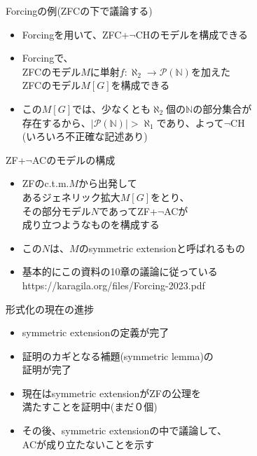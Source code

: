 \documentclass[17pt,aspectratio=169]{beamer}
\begin{document}
\begin{frame} {Forcingの例{\small (ZFCの下で議論する)}}
    \begin{itemize}
        \item Forcingを用いて、ZFC+$\neg$CHのモデルを構成できる
        \item Forcingで、\\
              ZFCのモデル$M$に単射$f : \aleph_2 \rightarrow \mathcal{P}(\mathbb{N})$を加えた\\
              ZFCのモデル$M[G]$を構成できる \\
        \item この$M[G]$では、少なくとも$\aleph_2$個の$\mathbb{N}$の部分集合が\\
              存在するから、$|\mathcal{P}(\mathbb{N})| > \aleph_1$であり、よって$\neg$CH \\
              {\footnotesize (いろいろ不正確な記述あり)}
    \end{itemize}
\end{frame}

\begin{frame} {ZF+$\neg$ACのモデルの構成}
    \begin{itemize}
        \item ZFのc.t.m.$M$から出発して\\
              あるジェネリック拡大$M[G]$をとり、\\
              その部分モデル$N$であってZF+$\neg$ACが\\
              成り立つようなものを構成する
        \item この$N$は、$M$のsymmetric extensionと呼ばれるもの
        \item 基本的にこの資料の10章の議論に従っている \\
              https://karagila.org/files/Forcing-2023.pdf
    \end{itemize}
\end{frame}

\begin{frame} {形式化の現在の進捗}
    \begin{itemize}
        \item symmetric extensionの定義が完了
        \item 証明のカギとなる補題(symmetric lemma)の\\証明が完了
        \item 現在はsymmetric extensionがZFの公理を\\満たすことを証明中{\small (まだ０個)}
        \item その後、symmetric extensionの中で議論して、\\ACが成り立たないことを示す
    \end{itemize}
\end{frame}
\end{document}
